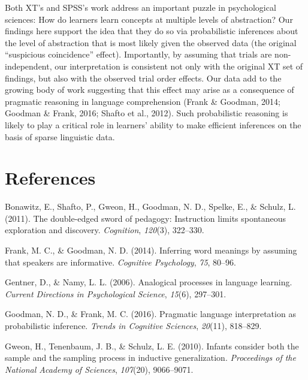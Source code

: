 \documentclass[english,floatsintext,man]{apa6}
\theoremstyle{definition}
\theoremstyle{definition}
\theoremstyle{definition}
\theoremstyle{remark}
\begin{document}
Both XT's and SPSS's work address an important puzzle in psychological
sciences: How do learners learn concepts at multiple levels of
abstraction? Our findings here support the idea that they do so via
probabilistic inferences about the level of abstraction that is most
likely given the observed data (the original \enquote{suspicious
coincidence} effect). Importantly, by assuming that trials are
non-independent, our interpretation is consistent not only with the
original XT set of findings, but also with the observed trial order
effects. Our data add to the growing body of work suggesting that this
effect may arise as a consequence of pragmatic reasoning in language
comprehension (Frank \& Goodman, 2014; Goodman \& Frank, 2016; Shafto et
al., 2012). Such probabilistic reasoning is likely to play a critical
role in learners' ability to make efficient inferences on the basis of
sparse linguistic data.

\newpage

\section{References}\label{references}

\setlength{\parindent}{-0.5in} \setlength{\leftskip}{0.5in}

\hypertarget{refs}{}
\hypertarget{ref-bonawitz2011}{}
Bonawitz, E., Shafto, P., Gweon, H., Goodman, N. D., Spelke, E., \&
Schulz, L. (2011). The double-edged sword of pedagogy: Instruction
limits spontaneous exploration and discovery. \emph{Cognition},
\emph{120}(3), 322--330.

\hypertarget{ref-frank2014}{}
Frank, M. C., \& Goodman, N. D. (2014). Inferring word meanings by
assuming that speakers are informative. \emph{Cognitive Psychology},
\emph{75}, 80--96.

\hypertarget{ref-gentner2006}{}
Gentner, D., \& Namy, L. L. (2006). Analogical processes in language
learning. \emph{Current Directions in Psychological Science},
\emph{15}(6), 297--301.

\hypertarget{ref-goodman2016}{}
Goodman, N. D., \& Frank, M. C. (2016). Pragmatic language
interpretation as probabilistic inference. \emph{Trends in Cognitive
Sciences}, \emph{20}(11), 818--829.

\hypertarget{ref-gweon2010}{}
Gweon, H., Tenenbaum, J. B., \& Schulz, L. E. (2010). Infants consider
both the sample and the sampling process in inductive generalization.
\emph{Proceedings of the National Academy of Sciences}, \emph{107}(20),
9066--9071.
\end{document}
